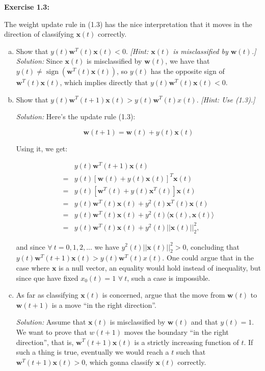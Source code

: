 \documentclass[12pt,letterpaper]{article}
\newcommand{\bx}{\boldsymbol{x}}
\newcommand{\bw}{\boldsymbol{w}}
\newcommand{\sign}{\operatorname{sign}}
\begin{document}
	\textbf{Exercise 1.3:}\cite{yaser2012learning} 
	
	The weight update rule in (1.3) has the nice interpretation that it moves in the direction of classifying $\bx(t)$ correctly. 
	\begin{enumerate}[(a)]
		\item Show that $y(t)\bw^{T}(t)\bx(t)<0.$ \emph{[Hint: $\bx(t)$ is misclassified by $\bw(t)$.]}
		\subitem \textit{Solution:}
		Since $\bx(t)$ is misclassified by $\bw(t)$, we have that $y(t)\neq\sign(\bw^{T}(t)\bx(t))$, so $y(t)$ has the opposite sign of $\bw^{T}(t)\bx(t)$, which implies directly that $y(t)\bw^{T}(t)\bx(t)<0.$
		
		\item Show that $y(t)\bw^{T}(t+1)\bx(t)>y(t)\bw^{T}(t)x(t)$. \emph{[Hint: Use (1.3).]}
		
		\subitem \textit{Solution:}
			Here's the update rule (1.3): 
			
			$$\bw(t+1)=\bw(t)+y(t)\bx(t)$$
			
			Using it, we get:
			
			\begin{align*}
				 &y(t)\bw^{T}(t+1)\bx(t)\\
				=&y(t)[\bw(t)+y(t)\bx(t)]^{T}\bx(t)\\
				=&y(t)[\bw^{T}(t)+y(t)\bx^{T}(t)]\bx(t)\\
				=&y(t)\bw^{T}(t)\bx(t)+y^2(t)\bx^{T}(t)\bx(t)\\
				=&y(t)\bw^{T}(t)\bx(t)+y^2(t)\langle\bx(t),\bx(t)\rangle\\
				=&y(t)\bw^{T}(t)\bx(t)+y^2(t)||\bx(t)||_2^2,
			\end{align*}
			
			and since $\forall ~t=0,1,2,...$ we have $y^2(t)||\bx(t)||_2^2>0$, concluding that $y(t)\bw^{T}(t+1)\bx(t)>y(t)\bw^{T}(t)x(t)$. One could argue that in the case where $\bx$ is a null vector, an equality would hold instead of inequality, but since que have fixed $x_0(t)=1$ $\forall ~t$, such a case is impossible.
		
		\item As far as classifying $\bx(t)$ is concerned, argue that the move from $\bw(t)$ to $\bw(t+1)$ is a move ``in the right direction''.
		
		\subitem \textit{Solution:} Assume that $\bx(t)$ is misclassified by $\bw(t)$ and that $y(t)=1$. We want to prove that $w(t+1)$ moves the boundary ``in the right direction'', that is, $\bw^{T}(t+1)\bx(t)$ is a strictly increasing function of $t$. If such a thing is true, eventually we would reach a $t$ such that $\bw^{T}(t+1)\bx(t)>0$, which gonna classify $\bx(t)$ correctly.
		

\end{enumerate}
\end{document}
